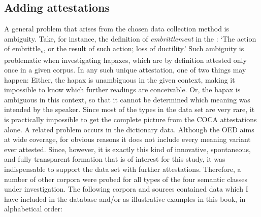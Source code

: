 \subsection{Adding attestations}
\label{sec:meth-revis-add}

A general problem that arises from the chosen data collection method is ambiguity. Take, for instance, the definition of \textit{embrittlement} in the : `The action of embrittle\textsubscript{v}, or the result of such action; loss of ductility.' Such ambiguity is problematic when investigating hapaxes, which are by definition attested only once in a given corpus. In any such unique attestation, one of two things may happen: Either, the hapax is unambiguous in the given context, making it impossible to know which further readings are conceivable. Or, the hapax is ambiguous in this context, so that it cannot be determined which meaning was intended by the speaker. Since most of the types in the data set are very rare, it is practically impossible to get the complete picture from the COCA attestations alone. A related problem occurs in the dictionary data. Although the OED aims at wide coverage, for obvious reasons it does not include every meaning variant ever attested. Since, however, it is exactly this kind of innovative, spontaneous, and fully transparent formation that is of interest for this study, it was indispensable to support the data set with further attestations. 
Therefore, a number of other corpora were probed for all types of the four semantic classes under investigation. 
The following corpora and sources contained data which I have included in the database and/or as illustrative examples in this book, in alphabetical order: 

